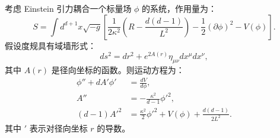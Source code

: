 \begin{proposition}\label{prop:holographic_rg_eq}
考虑 Einstein 引力耦合一个标量场 $\phi$ 的系统，作用量为：
\begin{equation}\label{eq:holographic_action}
    S = \int d^{d+1}x\sqrt{-g}\left[\frac{1}{2\kappa^2}\left(R - \frac{d(d-1)}{L^2}\right) - \frac{1}{2}(\partial\phi)^2 - V(\phi)\right].
\end{equation}
假设度规具有域墙形式：
\begin{equation}\label{eq:domain_wall}
    ds^2 = dr^2 + e^{2A(r)}\eta_{\mu\nu}dx^\mu dx^\nu,
\end{equation}
其中 $A(r)$ 是径向坐标的函数。则运动方程为：
\begin{align}
    \phi'' + dA'\phi' &= \frac{dV}{d\phi}, \label{eq:scalar_eom} \\
    A'' &= -\frac{\kappa^2}{d-1}\phi'^2, \label{eq:A_eom} \\
    (d-1)A'^2 &= \frac{\kappa^2}{2}\phi'^2 + V(\phi) + \frac{d(d-1)}{2L^2}. \label{eq:constraint}
\end{align}
其中 $'$ 表示对径向坐标 $r$ 的导数。
\end{proposition}


